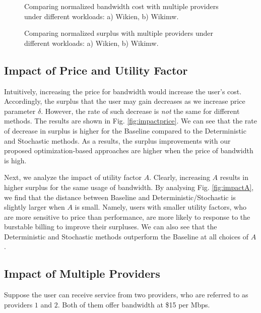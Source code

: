 \documentclass[10pt,journal,compsoc]{IEEEtran}
\begin{document}
\begin{figure}[!t]
\centering
{}
\caption{Comparing normalized bandwidth cost with multiple providers under different workloads: a) Wikien, b) Wikimw.}\label{fig:bandwidthmul}
\end{figure}

\begin{figure}[!t]
\centering
{}
\caption{Comparing normalized surplus with multiple providers under different workloads: a) Wikien, b) Wikimw.}\label{fig:performancemul}
\end{figure}
\subsection{Impact of Price and Utility Factor}\label{subsec:impactprice}
Intuitively, increasing the price for bandwidth would increase the user's cost. Accordingly, the surplus that the user may gain decreases as we increase price parameter $\delta$. However, the rate of such decrease is \emph{not} the same for different methods. The results are shown in Fig. \ref{fig:impactprice}. We can see that the rate of decrease in surplus is higher for the Baseline compared to the Deterministic and Stochastic methods. As a results, the surplus improvements with our proposed optimization-based approaches are higher when the price of bandwidth is high. 


Next, we analyze the impact of utility factor $A$. Clearly, increasing $A$ results in higher surplus for the same usage of bandwidth. By analysing Fig. \ref{fig:impactA}, we find that the distance between Baseline and Deterministic/Stochastic is slightly larger when $A$ is small. Namely, users with smaller utility factors, who are more sensitive to price than performance, are more likely to response to the burstable billing to improve their surpluses. We can also see that the Deterministic and Stochastic methods outperform the Baseline at all choices of $A$.





\subsection{Impact of Multiple Providers}\label{subsec:impactmulti}
Suppose the user can receive service from two providers, who are referred to as providers $1$ and $2$. Both of them offer bandwidth at \$15 per Mbps. 
\end{document}
